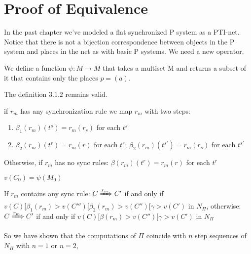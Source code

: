 \chapter{Proof of Equivalence}

In the past chapter we've modeled a flat synchronized P system as a PTI-net. 
Notice that there is not a bijection correspondence between objects in the P system and places in the net as with basic P systems.
We need a new operator.

\begin{definition}
We define a function $\psi: M \rightarrow M$ that takes a multiset M and returns a subset of it 
that contains only the places $p=(a)$.
\end{definition}

The definition \hyperref[def:map_conf]{$3.1.2$} remains valid.

\begin{definition}
if $r_m$ has any synchronization rule we map $r_m$ with two steps:
\begin{enumerate}
    \item $\beta_1(r_m)(t^s)=r_m(r_s)$ for each $t^s$
    \item $\beta_2(r_m)(t^r)=r_m(r)$ for each $t^r$;
    $\beta_2(r_m)(t^{s'})=r_m(r_s)$ for each $t^{s'}$    
\end{enumerate}
Otherwise, if $r_m$ has no sync rules: $\beta(r_m)(t^r)=r_m(r)$ for each $t^r$
\end{definition}

\begin{fact}[]
$v(C_0)=\psi(M_{0})$
\end{fact}

\begin{fact}[]
If $r_m$ contains any sync rule: 
$C \xRightarrow{r_m} C'$ if and only if 
$v(C)[\beta_1(r_m)> v(C''') [\beta_2(r_m)>v(C'')[\gamma>v(C')$ in $N_\Pi$,
otherwise: $C \xRightarrow{r_m} C'$ if and only if 
$v(C)[\beta(r_m)>v(C'')[\gamma>v(C')$ in $N_\Pi$
\end{fact}

So we have shown that the computations of $\Pi$ coincide with $n$ step sequences of $N_\Pi$ with $n=1$ or $n=2$, 
